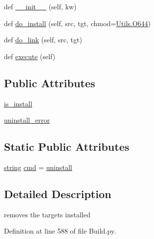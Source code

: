 \begin{DoxyCompactItemize}
\item 
def \hyperlink{classwaflib_1_1_build_1_1_uninstall_context_a4f1168ab484b0e1d748fefb5a6812b85}{\+\_\+\+\_\+init\+\_\+\+\_\+} (self, kw)
\item 
def \hyperlink{classwaflib_1_1_build_1_1_uninstall_context_a4b583a30eee0f110ab2b9b833aa00dd0}{do\+\_\+install} (self, src, tgt, chmod=\hyperlink{namespacewaflib_1_1_utils_ade9dd27fadbf52a0641bbff06d3dd3ac}{Utils.\+O644})
\item 
def \hyperlink{classwaflib_1_1_build_1_1_uninstall_context_a46252a8c474b628ac19e035c124f9e6b}{do\+\_\+link} (self, src, tgt)
\item 
def \hyperlink{classwaflib_1_1_build_1_1_uninstall_context_aadc84a51026ff5d9971566f29a0faaa8}{execute} (self)
\end{DoxyCompactItemize}
\subsection*{Public Attributes}
\begin{DoxyCompactItemize}
\item 
\hyperlink{classwaflib_1_1_build_1_1_uninstall_context_a9321a7038c8d4149292c1fdd19406ec1}{is\+\_\+install}
\item 
\hyperlink{classwaflib_1_1_build_1_1_uninstall_context_a5c820a859926188f982bc71a661522fd}{uninstall\+\_\+error}
\end{DoxyCompactItemize}
\subsection*{Static Public Attributes}
\begin{DoxyCompactItemize}
\item 
\hyperlink{test__lib_f_l_a_c_2format_8c_ab02026ad0de9fb6c1b4233deb0a00c75}{string} \hyperlink{classwaflib_1_1_build_1_1_uninstall_context_a85c62b3e6073981e63ef688485766335}{cmd} = \textquotesingle{}\hyperlink{classwaflib_1_1_build_1_1_install_context_ad779be37918b1fd345eed29e990c7afb}{uninstall}\textquotesingle{}
\end{DoxyCompactItemize}


\subsection{Detailed Description}
\begin{DoxyVerb}removes the targets installed\end{DoxyVerb}
 

Definition at line 588 of file Build.\+py.




